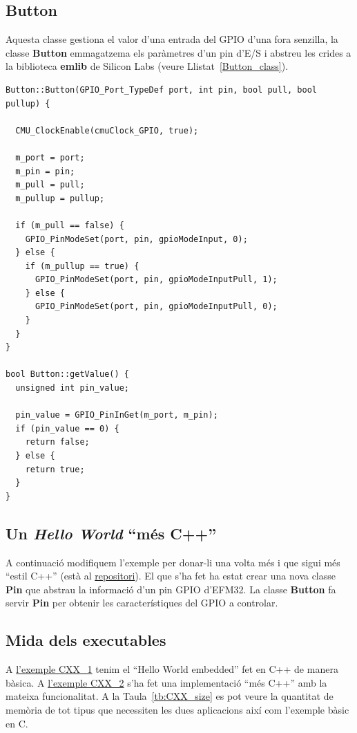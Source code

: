 \subsection{Button}
Aquesta classe gestiona el valor d'una entrada del \gls{GPIO} d'una fora senzilla, la classe {\bf Button} emmagatzema els paràmetres d'un pin d'E/S i abstreu les crides a la biblioteca {\bf emlib} de Silicon Labs (veure Llistat~\ref{Button_class}).

\begin{lstlisting}[caption={Part del codi de la classe LED},style=customc,label=Button_class]
Button::Button(GPIO_Port_TypeDef port, int pin, bool pull, bool pullup) {

  CMU_ClockEnable(cmuClock_GPIO, true);

  m_port = port;
  m_pin = pin;
  m_pull = pull;
  m_pullup = pullup;

  if (m_pull == false) {
    GPIO_PinModeSet(port, pin, gpioModeInput, 0);
  } else {
    if (m_pullup == true) {
      GPIO_PinModeSet(port, pin, gpioModeInputPull, 1);
    } else {
      GPIO_PinModeSet(port, pin, gpioModeInputPull, 0);
    }
  }
}

bool Button::getValue() {
  unsigned int pin_value;

  pin_value = GPIO_PinInGet(m_port, m_pin);
  if (pin_value == 0) {
    return false;
  } else {
    return true;
  }
}
\end{lstlisting}

\subsection{Un {\em Hello World} ``més C++''}
A continuació modifiquem l'exemple per donar-li una volta més i que sigui més ``estil C++'' (està al \href{https://github.com/mariusmm/cursembedded/tree/master/Simplicity/CXX_2}{repositori}). El que s'ha fet ha estat crear una nova classe {\bf Pin} que abstrau la informació d'un pin GPIO d'EFM32. La classe {\bf Button} fa servir {\bf Pin} per obtenir les característiques del GPIO a controlar.

\subsection{Mida dels executables}
\label{CXX_size}
A \href{https://github.com/mariusmm/cursembedded/tree/master/Simplicity/CXX_1}{l'exemple CXX\_1} tenim el ``Hello World embedded'' fet en C++ de manera bàsica. A \href{https://github.com/mariusmm/cursembedded/tree/master/Simplicity/CXX_2}{l'exemple CXX\_2} s'ha fet una implementació ``més C++'' amb la mateixa funcionalitat. A la Taula~\ref{tb:CXX_size} es pot veure la quantitat de memòria de tot tipus que necessiten les dues aplicacions així com l'exemple bàsic en C.

